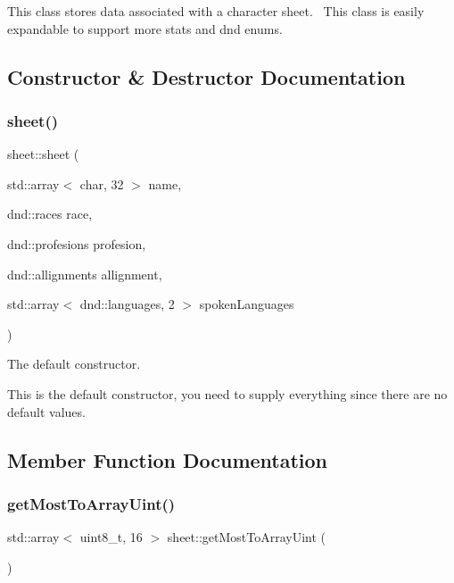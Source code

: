 This class stores data associated with a character sheet.~\newline
This class is easily expandable to support more stats and dnd enums. 

\subsection{Constructor \& Destructor Documentation}
\mbox{\label{classsheet_afae0c2b257d19526ca0482e3e246ec30}} 
\subsubsection{\texorpdfstring{sheet()}{sheet()}}
{\footnotesize\ttfamily sheet\+::sheet (\begin{DoxyParamCaption}\item[{std\+::array$<$ char, 32 $>$}]{name,  }\item[{dnd\+::races}]{race,  }\item[{dnd\+::profesions}]{profesion,  }\item[{dnd\+::allignments}]{allignment,  }\item[{std\+::array$<$ dnd\+::languages, 2 $>$}]{spoken\+Languages }\end{DoxyParamCaption})}



The default constructor. 

This is the default constructor, you need to supply everything since there are no default values. 

\subsection{Member Function Documentation}
\mbox{\label{classsheet_a4a9a029a5e816b0c4cb75441f231e2de}} 
\subsubsection{\texorpdfstring{get\+Most\+To\+Array\+Uint()}{getMostToArrayUint()}}
{\footnotesize\ttfamily std\+::array$<$ uint8\+\_\+t, 16 $>$ sheet\+::get\+Most\+To\+Array\+Uint (\begin{DoxyParamCaption}{ }\end{DoxyParamCaption})}



